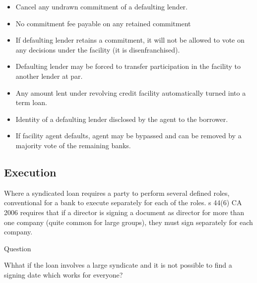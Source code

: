 \documentclass[
]{article}
\providecommand{\tightlist}{%
  \setlength{\itemsep}{0pt}\setlength{\parskip}{0pt}}
\newenvironment{env-74ec9a83-00fa-4ee6-a586-5d505a5676c9}
{
    \savenotes\tcolorbox[blanker,breakable,left=5pt,borderline west={2pt}{-4pt}{gray}]
}
{
    \endtcolorbox\spewnotes
}
\begin{document}
\begin{itemize}
\begin{itemize}
    \begin{itemize}
    \tightlist
    \item
      Cancel any undrawn commitment of a defaulting lender.
    \item
      No commitment fee payable on any retained commitment
    \item
      If defaulting lender retains a commitment, it will not be allowed
      to vote on any decisions under the facility (it is
      disenfranchised).
    \item
      Defaulting lender may be forced to transfer participation in the
      facility to another lender at par.
    \item
      Any amount lent under revolving credit facility automatically
      turned into a term loan.
    \item
      Identity of a defaulting lender disclosed by the agent to the
      borrower.
    \item
      If facility agent defaults, agent may be bypassed and can be
      removed by a majority vote of the remaining banks.
    \end{itemize}
  \end{itemize}
\end{itemize}

\hypertarget{execution}{%
\subsection{Execution}\label{execution}}

Where a syndicated loan requires a party to perform several defined
roles, conventional for a bank to execute separately for each of the
roles. s 44(6) CA 2006 requires that if a director is signing a document
as director for more than one company (quite common for large groups),
they must sign separately for each company.

\begin{env-74ec9a83-00fa-4ee6-a586-5d505a5676c9}

Question

Whhat if the loan involves a large syndicate and it is not possible to
find a signing date which works for everyone?

\end{env-74ec9a83-00fa-4ee6-a586-5d505a5676c9}
\end{document}

